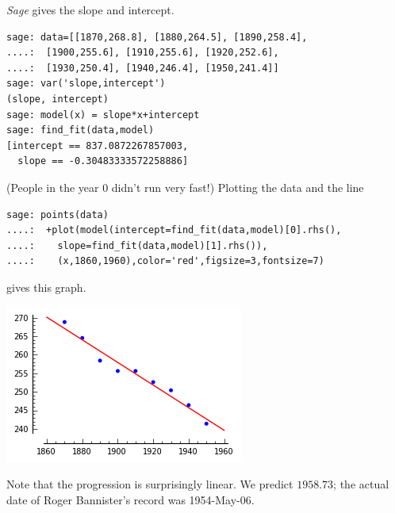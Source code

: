 \textit{Sage} gives the slope and intercept.
\begin{lstlisting}
sage: data=[[1870,268.8], [1880,264.5], [1890,258.4],   
....:  [1900,255.6], [1910,255.6], [1920,252.6],   
....:  [1930,250.4], [1940,246.4], [1950,241.4]] 
sage: var('slope,intercept')
(slope, intercept)
sage: model(x) = slope*x+intercept
sage: find_fit(data,model)
[intercept == 837.0872267857003, 
  slope == -0.30483333572258886]
\end{lstlisting}
(People in the year $0$ didn't run very fast!)
Plotting the data and the line
\begin{lstlisting}
sage: points(data)
....:  +plot(model(intercept=find_fit(data,model)[0].rhs(),
....:    slope=find_fit(data,model)[1].rhs()),
....:    (x,1860,1960),color='red',figsize=3,fontsize=7)  
\end{lstlisting}
gives this graph.  
\begin{center}
  \includegraphics{four_minute_mile.png}
\end{center}
Note that the progression is surprisingly linear.
We predict $1958.73$; the actual date of Roger Bannister's
record was 1954-May-06.

